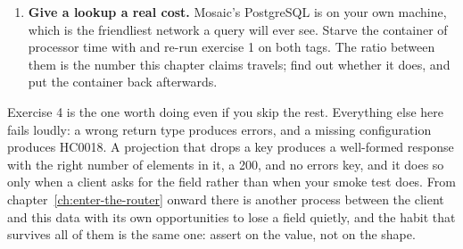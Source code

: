 \begin{enumerate}
  \item \textbf{Give a lookup a real cost.} Mosaic's PostgreSQL is on your own
  machine, which is the friendliest network a query will ever see. Starve the
  container of processor time with 
  and re-run exercise 1 on both tags. The ratio between them is the number this
  chapter claims travels; find out whether it does, and put the container back
  afterwards.
\end{enumerate}

Exercise 4 is the one worth doing even if you skip the rest. Everything else
here fails loudly: a wrong return type produces errors, and a missing
configuration produces HC0018. A projection that drops a key produces a
well-formed response with the right
number of elements in it, a 200, and no errors key, and it does so only when a
client asks for the field rather than when your smoke test does. From
chapter~\ref{ch:enter-the-router} onward there is another process between the
client and this data with its own opportunities to lose a field quietly, and the
habit that survives all of them is the same one: assert on the value, not on the
shape.
